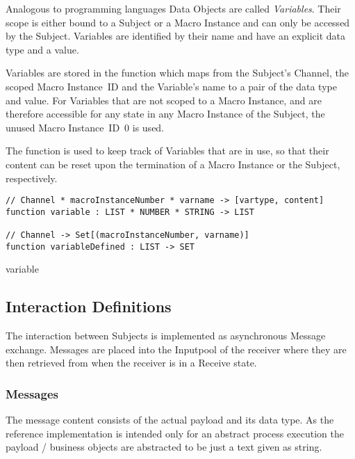 

Analogous to programming languages Data Objects are called \textit{Variables}.
Their scope is either bound to a Subject or a Macro Instance and can only be
accessed by the Subject. Variables are identified by their name and have an
explicit data type and a value.

Variables are stored in the  function which maps from
the Subject's Channel, the scoped Macro Instance~ID and the Variable's name to
a pair of the data type and value. For Variables that are not scoped to a Macro
Instance, and are therefore accessible for any state in any Macro Instance of
the Subject, the unused Macro Instance~ID~0 is used.

The function  is used to keep track of Variables
that are in use, so that their content can be reset upon the termination of a
Macro Instance or the Subject, respectively.


\begin{listing}[htbp]
\begin{verbatim}
// Channel * macroInstanceNumber * varname -> [vartype, content]
function variable : LIST * NUMBER * STRING -> LIST

// Channel -> Set[(macroInstanceNumber, varname)]
function variableDefined : LIST -> SET
\end{verbatim}
\caption{variable}
\label{lst:shortasm:variable}
\end{listing}




\subsection{Interaction Definitions}\label{sec:InteractionDefinitions}

The interaction between Subjects is implemented as asynchronous Message exchange.
Messages are placed into the Inputpool of the receiver where they are then retrieved from when the receiver is in a Receive state.


\subsubsection{Messages}\label{sec:messages}

The message content consists of the actual payload and its data type. As the
reference implementation is intended only for an abstract process execution
the payload / business objects are abstracted to be just a text given as string.

